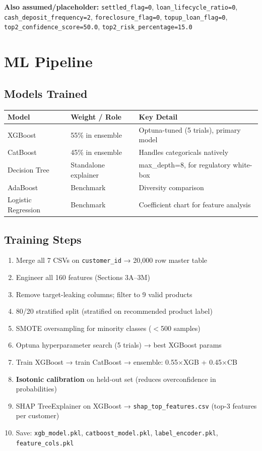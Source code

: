 \documentclass[12pt,a4paper]{article}
\begin{document}
\textbf{Also assumed/placeholder:}
\texttt{settled\_flag=0}, \texttt{loan\_lifecycle\_ratio=0}, \texttt{cash\_deposit\_frequency=2}, \texttt{foreclosure\_flag=0}, \texttt{topup\_loan\_flag=0}, \texttt{top2\_confidence\_score=50.0}, \texttt{top2\_risk\_percentage=15.0}

\newpage
\section{ML Pipeline}

\subsection{Models Trained}

\begin{tabular}{lll}
\toprule
\textbf{Model} & \textbf{Weight / Role} & \textbf{Key Detail} \\
\midrule
XGBoost        & 55\% in ensemble & Optuna-tuned (5 trials), primary model \\
CatBoost       & 45\% in ensemble & Handles categoricals natively \\
Decision Tree  & Standalone explainer & max\_depth=8, for regulatory white-box \\
AdaBoost       & Benchmark & Diversity comparison \\
Logistic Regression & Benchmark & Coefficient chart for feature analysis \\
\bottomrule
\end{tabular}

\subsection{Training Steps}

\begin{enumerate}[leftmargin=*,itemsep=2pt]
  \item Merge all 7 CSVs on \texttt{customer\_id} → 20{,}000 row master table
  \item Engineer all 160 features (Sections 3A–3M)
  \item Remove target-leaking columns; filter to 9 valid products
  \item 80/20 stratified split (stratified on recommended product label)
  \item SMOTE oversampling for minority classes ($<$500 samples)
  \item Optuna hyperparameter search (5 trials) → best XGBoost params
  \item Train XGBoost → train CatBoost → ensemble: 0.55$\times$XGB + 0.45$\times$CB
  \item \textbf{Isotonic calibration} on held-out set (reduces overconfidence in probabilities)
  \item SHAP TreeExplainer on XGBoost → \texttt{shap\_top\_features.csv} (top-3 features per customer)
  \item Save: \texttt{xgb\_model.pkl}, \texttt{catboost\_model.pkl}, \texttt{label\_encoder.pkl}, \texttt{feature\_cols.pkl}
\end{enumerate}
\end{document}
